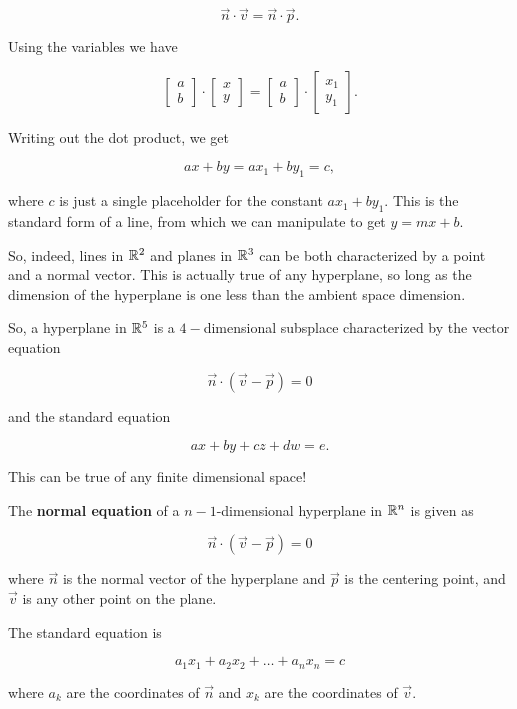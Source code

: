 \documentclass{ximera}
\begin{document}
$$\vec{n}\cdot \vec{v}=\vec{n}\cdot\vec{p}.$$

Using the variables we have 

$$\begin{bmatrix}
  a\\b
\end{bmatrix}\cdot \begin{bmatrix}
  x\\y
\end{bmatrix}=\begin{bmatrix}
  a\\b
\end{bmatrix}\cdot\begin{bmatrix}
  x_1\\y_1
\end{bmatrix}.$$

Writing out the dot product, we get

$$ax+by=ax_1+by_1=c,$$

where $c$ is just a single placeholder for the constant $ax_1+by_1$. This is the standard form of a line, from which we can manipulate to get $y=mx+b$.

So, indeed, lines in $\mathbb{R}^2$ and planes in $\mathbb{R}^3$ can be both characterized by a point and a normal vector. This is actually true of any hyperplane, so long as the dimension of the hyperplane is one less than the ambient space dimension.

So, a hyperplane in $\mathbb{R}^5$ is a $4-$dimensional subsplace characterized by the vector equation

$$\vec{n}\cdot(\vec{v}-\vec{p})=0$$

and the standard equation

$$ax+by+cz+dw=e.$$

This can be true of any finite dimensional space!

\begin{definition}
  The {\bf normal equation} of a $n-1$-dimensional hyperplane in $\mathbb{R}^n$ is given as

  $$\vec{n}\cdot(\vec{v}-\vec{p})=0$$

  where $\vec{n}$ is the normal vector of the hyperplane and $\vec{p}$ is the centering point, and $\vec{v}$ is any other point on the plane.

  The standard equation is 

  $$a_1x_1+a_2x_2+\ldots+a_nx_n=c$$

  where $a_k$ are the coordinates of $\vec{n}$ and $x_k$ are the coordinates of $\vec{v}$.
\end{definition}
\end{document}
